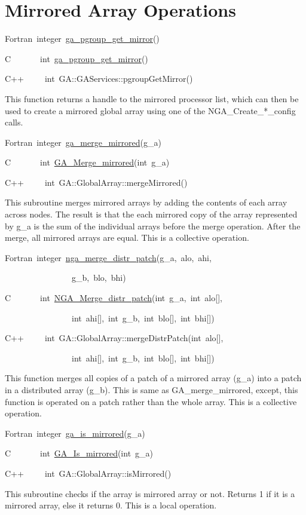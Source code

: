\section{Mirrored Array Operations}
\begin{lyxcode}
Fortran~integer~\href{http://www.emsl.pnl.gov/docs/global/ga_ops.html\#GA_PGROUP_GET_MIRROR}{ga\_{}pgroup\_{}get\_{}mirror}()~

C~~~~~~~int~\href{http://www.emsl.pnl.gov/docs/global/c_nga_ops.html\#GA_PGROUP_GET_MIRROR}{ga\_{}pgroup\_{}get\_{}mirror}()~

C++~~~~~int~GA::GAServices::pgroupGetMirror()
\end{lyxcode}
This function returns a handle to the mirrored processor list, which
can then be used to create a mirrored global array using one of the
NGA\_Create\_{*}\_config calls.
\begin{lyxcode}
Fortran~integer~\href{http://www.emsl.pnl.gov/docs/global/ga_ops.html\#GA_MERGE_MIRRORED}{ga\_{}merge\_{}mirrored}(g\_a)~

C~~~~~~~int~\href{http://www.emsl.pnl.gov/docs/global/c_nga_ops.html\#GA_MERGE_MIRRORED}{GA\_{}Merge\_{}mirrored}(int~g\_a)~

C++~~~~~int~GA::GlobalArray::mergeMirrored()
\end{lyxcode}
This subroutine merges mirrored arrays by adding the contents of each
array across nodes. The result is that the each mirrored copy of the
array represented by g\_a is the sum of the individual arrays before
the merge operation. After the merge, all mirrored arrays are equal.
This is a collective operation.
\begin{lyxcode}
Fortran~integer~\href{http://www.emsl.pnl.gov/docs/global/ga_ops.html\#GA_MERGE_DISTR_PATCH}{nga\_{}merge\_{}distr\_{}patch}(g\_a,~alo,~ahi,~

~~~~~~~~~~~~~~~~g\_b,~blo,~bhi)~

C~~~~~~~int~\href{http://www.emsl.pnl.gov/docs/global/c_nga_ops.html\#GA_MERGE_DISTR_PATCH}{NGA\_{}Merge\_{}distr\_{}patch}(int~g\_a,~int~alo{[}{]},~

~~~~~~~~~~~~~~~~int~ahi{[}{]},~int~g\_b,~int~blo{[}{]},~int~bhi{[}{]})~

C++~~~~~int~GA::GlobalArray::mergeDistrPatch(int~alo{[}{]},~

~~~~~~~~~~~~~~~~int~ahi{[}{]},~int~g\_b,~int~blo{[}{]},~int~bhi{[}{]})
\end{lyxcode}
This function merges all copies of a patch of a mirrored array (g\_a)
into a patch in a distributed array (g\_b). This is same as GA\_merge\_mirrored,
except, this function is operated on a patch rather than the whole
array. This is a collective operation.
\begin{lyxcode}
Fortran~integer~\href{http://www.emsl.pnl.gov/docs/global/ga_ops.html\#ga_is_mirrored}{ga\_{}is\_{}mirrored}(g\_a)~

C~~~~~~~int~\href{http://www.emsl.pnl.gov/docs/global/c_nga_ops.html\#ga_is_mirrored}{GA\_{}Is\_{}mirrored}(int~g\_a)~

C++~~~~~int~GA::GlobalArray::isMirrored()
\end{lyxcode}
This subroutine checks if the array is mirrored array or not. Returns
1 if it is a mirrored array, else it returns 0. This is a local operation. 
